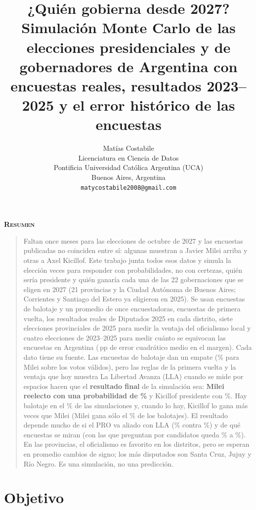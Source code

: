 \documentclass{article}
\title{¿Quién gobierna desde 2027?\\[0.3em]
\large Simulación Monte Carlo de las elecciones presidenciales y de
gobernadores de Argentina con encuestas reales, resultados 2023--2025 y el
error histórico de las encuestas}
\author{
  Matías Costabile \\
  Licenciatura en Ciencia de Datos\\
  Pontificia Universidad Católica Argentina (UCA)\\
  Buenos Aires, Argentina \\
  \texttt{matycostabile2008@gmail.com} \\
}
\renewenvironment{abstract}
  {\centerline{\large \bfseries \scshape Resumen}\begin{quote}}
  {\end{quote}}
\newcommand{\pp}{\,pp}
\begin{document}
\maketitle

\begin{abstract}
Faltan once meses para las elecciones de octubre de 2027 y las encuestas
publicadas no coinciden entre sí: algunas muestran a Javier Milei arriba y otras
a Axel Kicillof. Este trabajo junta todos esos datos y simula la elección
\nSim{} veces para responder con probabilidades, no con certezas, quién sería
presidente y quién ganaría cada una de las 22 gobernaciones que se eligen en 2027
(21 provincias y la Ciudad Autónoma de Buenos Aires; Corrientes y Santiago del
Estero ya eligieron en 2025). Se usan \nEncBal{} encuestas de balotaje y un
promedio de once encuestadoras, encuestas de primera vuelta, los resultados
reales de Diputados 2025 en cada distrito, siete elecciones provinciales de 2025
para medir la ventaja del oficialismo local y cuatro elecciones de 2023--2025
para medir cuánto se equivocan las encuestas en Argentina (\rmseMargen\pp{} de
error cuadrático medio en el margen). Cada dato tiene su fuente. Las encuestas
de balotaje dan un empate (\muBal\% para Milei sobre los votos válidos), pero las
reglas de la primera vuelta y la ventaja que hoy muestra La Libertad Avanza (LLA)
cuando se mide por espacios hacen que el \textbf{resultado final} de la
simulación sea: \textbf{Milei reelecto con una probabilidad de \pMileiFinal\%} y
Kicillof presidente con \pKiciFinal\%. Hay balotaje en el \pBalFinal\% de las
simulaciones y, cuando lo hay, Kicillof lo gana más veces que Milei (Milei gana
sólo el \pMileiCondFinal\% de los balotajes). El resultado depende mucho de si el
PRO va aliado con LLA (\pMileiA\% contra \pMileiB\%) y de qué encuestas se miran
(con las que preguntan por candidatos queda \pMileiC\% a \pKiciC\%). En las
provincias, el oficialismo es favorito en los \nOfiFavorito{} distritos, pero se
esperan en promedio \cambiosEsperados{} cambios de signo; los más disputados son
Santa Cruz, Jujuy y Río Negro. Es una simulación, no una predicción.
\end{abstract}


\section{Objetivo}
\end{document}
